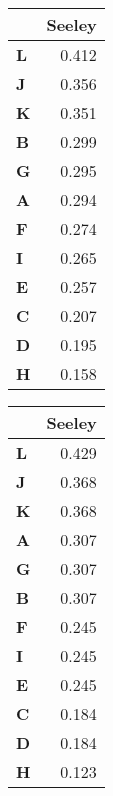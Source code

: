 \begin{table}[!h]
\centering
\centering
\begin{tabular}[t]{>{}lr}
\toprule
  & \vphantom{1} Seeley\\
\midrule
\textbf{L} & 0.412\\
\textbf{J} & 0.356\\
\textbf{K} & 0.351\\
\textbf{B} & 0.299\\
\textbf{G} & 0.295\\
\textbf{A} & 0.294\\
\textbf{F} & 0.274\\
\textbf{I} & 0.265\\
\textbf{E} & 0.257\\
\textbf{C} & 0.207\\
\textbf{D} & 0.195\\
\textbf{H} & 0.158\\
\bottomrule
\end{tabular}
\centering
\begin{tabular}[t]{lr}
\toprule
\textbf{ } & Seeley\\
\midrule
\textbf{L} & 0.429\\
\textbf{J} & 0.368\\
\textbf{K} & 0.368\\
\textbf{A} & 0.307\\
\textbf{G} & 0.307\\
\textbf{B} & 0.307\\
\textbf{F} & 0.245\\
\textbf{I} & 0.245\\
\textbf{E} & 0.245\\
\textbf{C} & 0.184\\
\textbf{D} & 0.184\\
\textbf{H} & 0.123\\
\bottomrule
\end{tabular}
\end{table}

